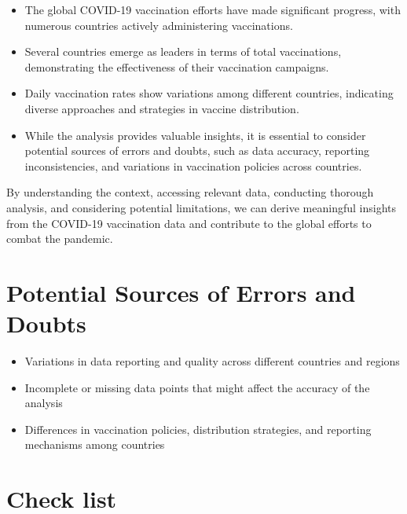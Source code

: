 \documentclass[
  10pt,
  dvipsnames,enabledeprecatedfontcommands]{scrartcl}
\providecommand{\tightlist}{%
  \setlength{\itemsep}{0pt}\setlength{\parskip}{0pt}}
\begin{document}
\begin{itemize}
\tightlist
\item
  The global COVID-19 vaccination efforts have made significant
  progress, with numerous countries actively administering vaccinations.
\item
  Several countries emerge as leaders in terms of total vaccinations,
  demonstrating the effectiveness of their vaccination campaigns.
\item
  Daily vaccination rates show variations among different countries,
  indicating diverse approaches and strategies in vaccine distribution.
\item
  While the analysis provides valuable insights, it is essential to
  consider potential sources of errors and doubts, such as data
  accuracy, reporting inconsistencies, and variations in vaccination
  policies across countries.
\end{itemize}

By understanding the context, accessing relevant data, conducting
thorough analysis, and considering potential limitations, we can derive
meaningful insights from the COVID-19 vaccination data and contribute to
the global efforts to combat the pandemic.

\hypertarget{potential-sources-of-errors-and-doubts}{%
\section*{Potential Sources of Errors and
Doubts}\label{potential-sources-of-errors-and-doubts}}

\begin{itemize}
\tightlist
\item
  Variations in data reporting and quality across different countries
  and regions
\item
  Incomplete or missing data points that might affect the accuracy of
  the analysis
\item
  Differences in vaccination policies, distribution strategies, and
  reporting mechanisms among countries
\end{itemize}

\hypertarget{check-list}{%
\section*{Check list}\label{check-list}}
\end{document}
